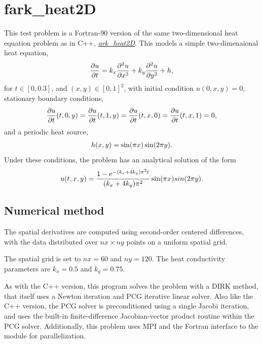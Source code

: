 \documentclass[letterpaper,10pt,english]{sphinxmanual}
\begin{document}
\section{fark\_heat2D}
\label{f90_parallel:fark-heat2d}\label{f90_parallel:id1}
This test problem is a Fortran-90 version of the same two-dimensional
heat equation problem as in C++, {\hyperref[cpp_parallel:ark-heat2d]{\emph{ark\_heat2D}}}.  This models a
simple two-dimenaional heat equation,
\begin{gather}
\begin{split}\frac{\partial u}{\partial t} = k_x \frac{\partial^2 u}{\partial x^2}
                              + k_y \frac{\partial^2 u}{\partial y^2} + h,\end{split}\notag
\end{gather}
for $t \in [0, 0.3]$, and $(x,y) \in [0, 1]^2$, with initial
condition $u(0,x,y) = 0$, stationary boundary conditions,
\begin{gather}
\begin{split}\frac{\partial u}{\partial t}(t,0,y) = \frac{\partial u}{\partial t}(t,1,y) =
\frac{\partial u}{\partial t}(t,x,0) = \frac{\partial u}{\partial t}(t,x,1) = 0,\end{split}\notag
\end{gather}
and a periodic heat source,
\begin{gather}
\begin{split}h(x,y) = \sin(\pi x) \sin(2\pi y).\end{split}\notag
\end{gather}
Under these conditions, the problem has an analytical solution of the
form
\begin{gather}
\begin{split}u(t,x,y) = \frac{1 - e^{-(k_x+4k_y)\pi^2 t}}{(k_x+4k_y)\pi^2} \sin(\pi x) sin(2\pi y).\end{split}\notag
\end{gather}

\subsection{Numerical method}
\label{f90_parallel:numerical-method}
The spatial derivatives are computed using second-order
centered differences, with the data distributed over $nx\times
ny$ points on a uniform spatial grid.

The spatial grid is set to $nx=60$ and $ny=120$.  The heat
conductivity parameters are $k_x=0.5$ and $k_y=0.75$.

As with the C++ version, this program solves the problem with a DIRK
method, that itself uses a Newton iteration and PCG iterative linear
solver.  Also like the C++ version, the PCG solver is preconditioned
using a single Jacobi iteration, and uses the built-in
finite-difference Jacobian-vector product routine within the PCG
solver.  Additionally, this problem uses MPI and the Fortran interface
to the  module for parallelization.



\renewcommand{\indexname}{Index}
\printindex
\end{document}
